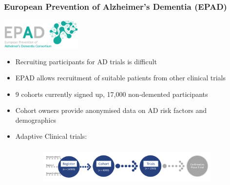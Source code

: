 \documentclass[10pt,xcolor=table]{beamer}
\begin{document}
\begin{frame}
\frametitle{European Prevention of Alzheimer’s Dementia (EPAD)}

\includegraphics[height=1.5cm,right]{EPADlogo}  
\vspace{1em}
\begin{itemize}
 \item Recruiting participants for AD trials is difficult
 \item EPAD allows recruitment of suitable patients from other clinical trials
 \item 9 cohorts currently signed up, 17,000 non-demented participants
 \item Cohort owners provide anonymised data on AD risk factors and demographics
 \item Adaptive Clinical trials: 
\end{itemize}

\begin{figure}
\begin{subfigure}{1\textwidth}
\centering
\includegraphics[height=2cm,right]{epad_flow}  
\end{subfigure}
\end{figure}
\vspace{-1em}
\end{frame}
\end{document}
